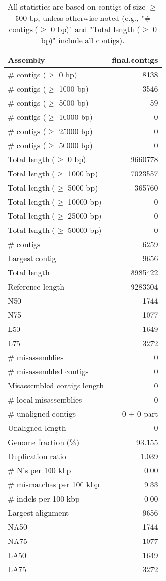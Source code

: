 \documentclass[12pt,a4paper]{article}
\begin{document}
\begin{table}[ht]
\begin{center}
\caption{All statistics are based on contigs of size $\geq$ 500 bp, unless otherwise noted (e.g., "\# contigs ($\geq$ 0 bp)" and "Total length ($\geq$ 0 bp)" include all contigs).}
\begin{tabular}{|l*{1}{|r}|}
\hline
Assembly & final.contigs \\ \hline
\# contigs ($\geq$ 0 bp) & 8138 \\ \hline
\# contigs ($\geq$ 1000 bp) & 3546 \\ \hline
\# contigs ($\geq$ 5000 bp) & 59 \\ \hline
\# contigs ($\geq$ 10000 bp) & 0 \\ \hline
\# contigs ($\geq$ 25000 bp) & 0 \\ \hline
\# contigs ($\geq$ 50000 bp) & 0 \\ \hline
Total length ($\geq$ 0 bp) & 9660778 \\ \hline
Total length ($\geq$ 1000 bp) & 7023557 \\ \hline
Total length ($\geq$ 5000 bp) & 365760 \\ \hline
Total length ($\geq$ 10000 bp) & 0 \\ \hline
Total length ($\geq$ 25000 bp) & 0 \\ \hline
Total length ($\geq$ 50000 bp) & 0 \\ \hline
\# contigs & 6259 \\ \hline
Largest contig & 9656 \\ \hline
Total length & 8985422 \\ \hline
Reference length & 9283304 \\ \hline
N50 & 1744 \\ \hline
N75 & 1077 \\ \hline
L50 & 1649 \\ \hline
L75 & 3272 \\ \hline
\# misassemblies & 0 \\ \hline
\# misassembled contigs & 0 \\ \hline
Misassembled contigs length & 0 \\ \hline
\# local misassemblies & 0 \\ \hline
\# unaligned contigs & 0 + 0 part \\ \hline
Unaligned length & 0 \\ \hline
Genome fraction (\%) & 93.155 \\ \hline
Duplication ratio & 1.039 \\ \hline
\# N's per 100 kbp & 0.00 \\ \hline
\# mismatches per 100 kbp & 9.33 \\ \hline
\# indels per 100 kbp & 0.00 \\ \hline
Largest alignment & 9656 \\ \hline
NA50 & 1744 \\ \hline
NA75 & 1077 \\ \hline
LA50 & 1649 \\ \hline
LA75 & 3272 \\ \hline
\end{tabular}
\end{center}
\end{table}
\end{document}
